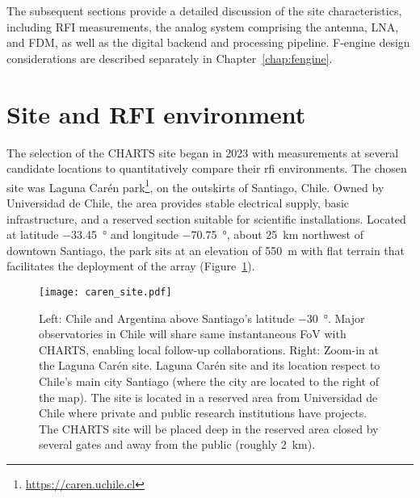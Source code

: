 The subsequent sections provide a detailed discussion of the site characteristics, including RFI measurements, the analog system comprising the antenna, LNA, and FDM, as well as the digital backend and processing pipeline. F-engine design considerations are described separately in Chapter~\ref{chap:fengine}.

\section{Site and RFI environment}
The selection of the CHARTS site began in 2023 with measurements at several candidate locations to quantitatively compare their \gls{rfi} environments. The chosen site was Laguna Carén park\footnote{\url{https://caren.uchile.cl}}, on the outskirts of Santiago, Chile. Owned by Universidad de Chile, the area provides stable electrical supply, basic infrastructure, and a reserved section suitable for scientific installations. Located at latitude \qty{-33.45}{\degree} and longitude \qty{-70.75}{\degree}, about \qty{25}{\kilo\m} northwest of downtown Santiago, the park sits at an elevation of \qty{550}{\m} with flat terrain that facilitates the deployment of the array (Figure~\ref{fig:caren_site}).  

\begin{figure}[h!]
  \centering
  \texttt{[image: caren\_site.pdf]}
  \caption[Site location compared to other observatories]{Left: Chile and Argentina above Santiago's latitude \qty{-30}{\degree}. Major observatories in Chile will share same instantaneous FoV with CHARTS, enabling local follow-up collaborations. Right: Zoom-in at the Laguna Carén site. Laguna Carén site and its location respect to Chile's main city Santiago (where the city are located to the right of the map). The site is located in a reserved area from Universidad de Chile where private and public research institutions have projects. The CHARTS site will be placed deep in the reserved area closed by several gates and away from the public (roughly \qty{2}{\kilo\m}).}
  \label{fig:caren_site}
\end{figure}

